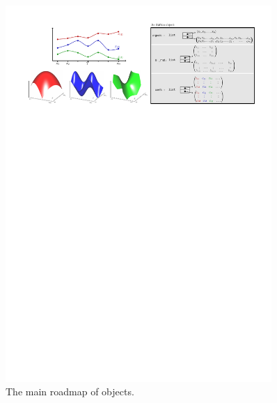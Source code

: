 \begin{figure}[ht]
	\centering
	\includegraphics[page=1,width=0.9\textwidth]{figures/fts.pdf}
	\caption{The main roadmap of  objects.}
	\label{fig:fts}
\end{figure}
